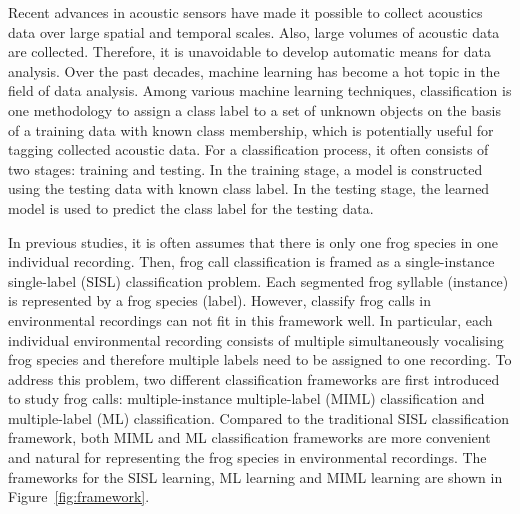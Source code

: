 Recent advances in acoustic sensors have made it possible to collect acoustics data over large spatial and temporal scales. Also, large volumes of acoustic data are collected. Therefore, it is unavoidable to develop automatic means for data analysis. Over the past decades, machine learning has become a hot topic in the field of data analysis. Among various machine learning techniques, classification is one methodology to assign a class label to a set of unknown objects on the basis of a training data with known class membership, which is potentially useful for tagging collected acoustic data. For a classification process, it often consists of two stages: training and testing. In the training stage, a model is constructed using the testing data with known class label. In the testing stage, the learned model is used to predict the class label for the testing data. 

In previous studies, it is often assumes that there is only one frog species in one individual recording. Then, frog call classification is framed as a single-instance single-label (SISL) classification problem. Each segmented frog syllable (instance) is represented by a frog species (label). 
However, classify frog calls in environmental recordings can not fit in this framework well. In particular, each individual environmental recording consists of multiple simultaneously vocalising frog species and therefore multiple labels need to be assigned to one recording. To address this problem, two different classification frameworks are first introduced to study frog calls: multiple-instance multiple-label (MIML) classification and multiple-label (ML) classification. Compared to the traditional SISL classification framework, both MIML and ML classification frameworks are more convenient and natural for representing the frog species in environmental recordings. The frameworks for the SISL learning, ML learning and MIML learning are shown in Figure~\ref{fig:framework}.


